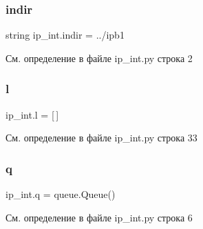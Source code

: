 \subsubsection{\texorpdfstring{indir}{indir}}
{\footnotesize\ttfamily string ip\+\_\+int.\+indir = \textquotesingle{}../ipb1\textquotesingle{}}



См. определение в файле ip\+\_\+int.\+py строка 2

\mbox{\label{namespaceip__int_a90a8e9b5b88d1a0fae518baba83a9f83}} 
\subsubsection{\texorpdfstring{l}{l}}
{\footnotesize\ttfamily ip\+\_\+int.\+l = \mbox{[}$\,$\mbox{]}}



См. определение в файле ip\+\_\+int.\+py строка 33

\mbox{\label{namespaceip__int_a041dcaccf2a18938362434abd47fdc4e}} 
\subsubsection{\texorpdfstring{q}{q}}
{\footnotesize\ttfamily ip\+\_\+int.\+q = queue.\+Queue()}



См. определение в файле ip\+\_\+int.\+py строка 6


